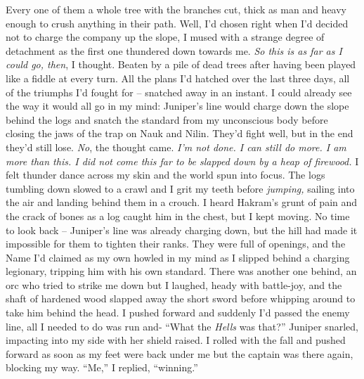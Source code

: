 \documentclass[12pt, openany]{book}
\begin{document}
Every one of them a whole tree with the branches cut, thick as man and heavy enough to crush anything in their path. Well, I’d chosen right when I’d decided not to charge the company up the slope, I mused with a strange degree of detachment as the first one thundered down towards me. \textit{So this is as far as I could go, then}, I thought. Beaten by a pile of dead trees after having been played like a fiddle at every turn. All the plans I’d hatched over the last three days, all of the triumphs I’d fought for – snatched away in an instant. I could already see the way it would all go in my mind: Juniper’s line would charge down the slope behind the logs and snatch the standard from my unconscious body before closing the jaws of the trap on Nauk and Nilin. They’d fight well, but in the end they’d still lose. \textit{No}, the thought came.\textit{ I’m not done. I can still do more. I am more than this. I did not come this far to be slapped down by a heap of firewood. }
I felt thunder dance across my skin and the world spun into focus. The logs tumbling down slowed to a crawl and I grit my teeth before \textit{jumping,} sailing into the air and landing behind them in a crouch. I heard Hakram’s grunt of pain and the crack of bones as a log caught him in the chest, but I kept moving. No time to look back – Juniper’s line was already charging down, but the hill had made it impossible for them to tighten their ranks. They were full of openings, and the Name I’d claimed as my own howled in my mind as I slipped behind a charging legionary, tripping him with his own standard. There was another one behind, an orc who tried to strike me down but I laughed, heady with battle-joy, and the shaft of hardened wood slapped away the short sword before whipping around to take him behind the head. I pushed forward and suddenly I’d passed the enemy line, all I needed to do was run and-
“What the \textit{Hells }was that?” Juniper snarled, impacting into my side with her shield raised.
I rolled with the fall and pushed forward as soon as my feet were back under me but the captain was there again, blocking my way.
“Me,” I replied, “winning.”
\end{document}
